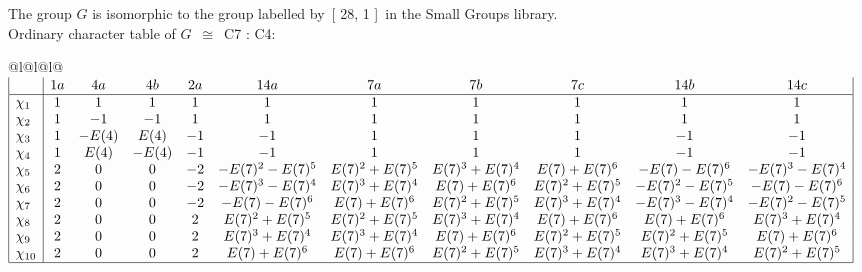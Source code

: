 \documentclass[varwidth=\maxdimen,border=10]{standalone}
\begin{document}
The group $G$ is isomorphic to the group labelled by\ [ 28, 1 ]\ in the Small Groups library.\\
Ordinary character table of $G$\ $\cong$\ C7 : C4:\\
\begin{center}
\begin{tabular}{@{}l@{}l@{}l@{}}
\hline
\(\begin{array}{|l|cccccccccc|}
  & 1a & 4a & 4b & 2a & 14a & 7a & 7b & 7c & 14b & 14c\\ \hline
\chi_{1} & 1 & 1 & 1 & 1 & 1 & 1 & 1 & 1 & 1 & 1\\
\chi_{2} & 1 & -1 & -1 & 1 & 1 & 1 & 1 & 1 & 1 & 1\\
\chi_{3} & 1 & -E(4) & E(4) & -1 & -1 & 1 & 1 & 1 & -1 & -1\\
\chi_{4} & 1 & E(4) & -E(4) & -1 & -1 & 1 & 1 & 1 & -1 & -1\\
\chi_{5} & 2 & 0 & 0 & -2 & -E(7)^{2}-E(7)^{5} & E(7)^{2}+E(7)^{5} & E(7)^{3}+E(7)^{4} & E(7)+E(7)^{6} & -E(7)-E(7)^{6} & -E(7)^{3}-E(7)^{4}\\
\chi_{6} & 2 & 0 & 0 & -2 & -E(7)^{3}-E(7)^{4} & E(7)^{3}+E(7)^{4} & E(7)+E(7)^{6} & E(7)^{2}+E(7)^{5} & -E(7)^{2}-E(7)^{5} & -E(7)-E(7)^{6}\\
\chi_{7} & 2 & 0 & 0 & -2 & -E(7)-E(7)^{6} & E(7)+E(7)^{6} & E(7)^{2}+E(7)^{5} & E(7)^{3}+E(7)^{4} & -E(7)^{3}-E(7)^{4} & -E(7)^{2}-E(7)^{5}\\
\chi_{8} & 2 & 0 & 0 & 2 & E(7)^{2}+E(7)^{5} & E(7)^{2}+E(7)^{5} & E(7)^{3}+E(7)^{4} & E(7)+E(7)^{6} & E(7)+E(7)^{6} & E(7)^{3}+E(7)^{4}\\
\chi_{9} & 2 & 0 & 0 & 2 & E(7)^{3}+E(7)^{4} & E(7)^{3}+E(7)^{4} & E(7)+E(7)^{6} & E(7)^{2}+E(7)^{5} & E(7)^{2}+E(7)^{5} & E(7)+E(7)^{6}\\
\chi_{10} & 2 & 0 & 0 & 2 & E(7)+E(7)^{6} & E(7)+E(7)^{6} & E(7)^{2}+E(7)^{5} & E(7)^{3}+E(7)^{4} & E(7)^{3}+E(7)^{4} & E(7)^{2}+E(7)^{5}\\
\hline
\end{array}\)\\
\end{tabular}
\end{center}
\end{document}
